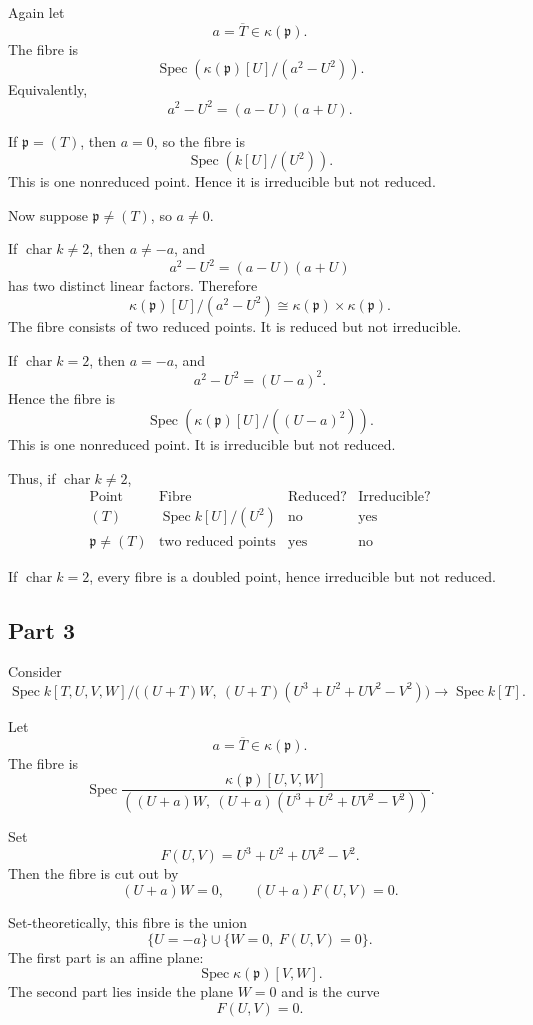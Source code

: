 \documentclass[12pt,a4paper]{article}
\theoremstyle{notespace}
\begin{document}
Again let
\[
a=\overline{T}\in \kappa(\mathfrak{p}).
\]
The fibre is
\[
\operatorname{Spec}
\left(
\kappa(\mathfrak{p})[U]/(a^2-U^2)
\right).
\]
Equivalently,
\[
a^2-U^2=(a-U)(a+U).
\]

If \(\mathfrak{p}=(T)\), then \(a=0\), so the fibre is
\[
\operatorname{Spec}\left(k[U]/(U^2)\right).
\]
This is one nonreduced point. Hence it is irreducible but not reduced.

Now suppose \(\mathfrak{p}\neq (T)\), so \(a\neq 0\).

If \(\operatorname{char}k\neq 2\), then \(a\neq -a\), and
\[
a^2-U^2=(a-U)(a+U)
\]
has two distinct linear factors. Therefore
\[
\kappa(\mathfrak{p})[U]/(a^2-U^2)
\cong
\kappa(\mathfrak{p})\times \kappa(\mathfrak{p}).
\]
The fibre consists of two reduced points. It is reduced but not
irreducible.

If \(\operatorname{char}k=2\), then \(a=-a\), and
\[
a^2-U^2=(U-a)^2.
\]
Hence the fibre is
\[
\operatorname{Spec}
\left(
\kappa(\mathfrak{p})[U]/((U-a)^2)
\right).
\]
This is one nonreduced point. It is irreducible but not reduced.

Thus, if \(\operatorname{char}k\neq 2\),
\[
\begin{array}{c|c|c|c}
	\text{Point}
	&
	\text{Fibre}
	&
	\text{Reduced?}
	&
	\text{Irreducible?}
	\\
	\hline
	(T)
	&
	\operatorname{Spec}k[U]/(U^2)
	&
	\text{no}
	&
	\text{yes}
	\\
	\mathfrak{p}\neq (T)
	&
	\text{two reduced points}
	&
	\text{yes}
	&
	\text{no}
\end{array}
\]

If \(\operatorname{char}k=2\), every fibre is a doubled point, hence
irreducible but not reduced.

\subsection{Part 3}

Consider
\[
\operatorname{Spec}
k[T,U,V,W]/
\bigl((U+T)W,\ (U+T)(U^3+U^2+UV^2-V^2)\bigr)
\longrightarrow
\operatorname{Spec}k[T].
\]

Let
\[
a=\overline{T}\in \kappa(\mathfrak{p}).
\]
The fibre is
\[
\operatorname{Spec}
\frac{\kappa(\mathfrak{p})[U,V,W]}
{
	((U+a)W,\ (U+a)(U^3+U^2+UV^2-V^2))
}.
\]

Set
\[
F(U,V)=U^3+U^2+UV^2-V^2.
\]
Then the fibre is cut out by
\[
(U+a)W=0,
\qquad
(U+a)F(U,V)=0.
\]

Set-theoretically, this fibre is the union
\[
\{U=-a\}
\cup
\{W=0,\ F(U,V)=0\}.
\]
The first part is an affine plane:
\[
\operatorname{Spec}\kappa(\mathfrak{p})[V,W].
\]
The second part lies inside the plane \(W=0\) and is the curve
\[
F(U,V)=0.
\]
\end{document}
